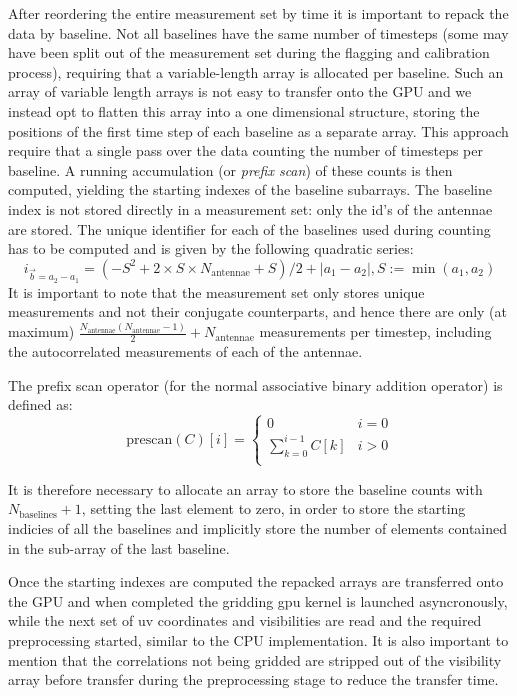 After reordering the entire measurement set by time it is important to repack the data by baseline. 
Not all baselines have the same number of timesteps (some may have been split out of the measurement 
set during the flagging and calibration process), requiring that a variable-length array is allocated
per baseline. Such an array of variable length arrays is not easy to transfer onto the GPU and we instead
opt to flatten this array into a one dimensional structure, storing the positions of the first time step
of each baseline as a separate array. This approach require that a single pass over the data counting 
the number of timesteps per baseline. A running accumulation (or \textit{prefix scan}) of these counts
is then computed, yielding the starting indexes of the baseline subarrays. The baseline index is not
stored directly in a measurement set: only the id's of the antennae are stored. The unique identifier
for each of the baselines used during counting has to be computed and is given by the following quadratic series:
\begin{equation}
 i_{\vec{b}=a_2-a_1} = (-S^2 + 2\times S\times N_\text{antennae} + S) / 2 + |a_1 - a_2|, S := \min(a_1,a_2)
\end{equation}
It is important to note that the measurement set only stores unique measurements and not their conjugate 
counterparts, and hence there are only (at maximum) $\frac{N_\text{antennae}(N_\text{antennae} - 1)}{2} + N_\text{antennae}$
measurements per timestep, including the autocorrelated measurements of each of the antennae.

The prefix scan operator (for the normal associative binary addition operator) is defined as:
\begin{equation}
 \text{prescan}(C)[i] = 
			\begin{cases}
			  0 & i = 0 \\
			  \sum_{k=0}^{i-1}{C[k]} & i > 0 \\
			\end{cases}
\end{equation}

It is therefore necessary to allocate an array to store the baseline counts with $N_\text{baselines} + 1$, setting the last element to zero,
in order to store the starting indicies of all the baselines and implicitly store the number of elements contained in the sub-array of the last
baseline.

Once the starting indexes are computed the repacked arrays are transferred onto the GPU and when completed the gridding gpu kernel is 
launched asyncronously, while the next set of uv coordinates and visibilities are read and the required preprocessing started, similar 
to the CPU implementation. It is also important to mention that the correlations not being gridded are stripped out of the visibility 
array before transfer during the preprocessing stage to reduce the transfer time.

